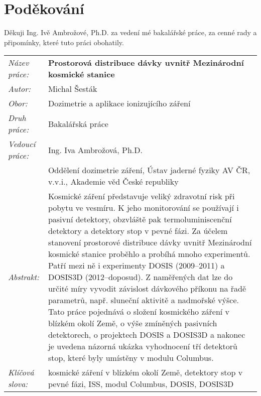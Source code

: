 \section*{Poděkování}
Děkuji Ing. Ivě Ambrožové, Ph.D. za vedení mé bakalářské práce, za cenné rady a připomínky, které tuto práci obohatily.
\newpage
\begin{tabularx}{\textwidth}{>{\itshape}l X}
  Název práce: & \textbf{Prostorová distribuce dávky uvnitř Mezinárodní kosmické stanice}\\
  Autor: & Michal Šesták\\
  Obor: & Dozimetrie a aplikace ionizujícího záření\\
  Druh práce: & Bakalářská práce\\
  Vedoucí práce: & Ing. Iva Ambrožová, Ph.D.\\ 
               & Oddělení dozimetrie záření, Ústav jaderné fyziky AV ČR, v.v.i., Akademie věd České republiky\\
  Abstrakt: & Kosmické záření představuje veliký zdravotní risk při pobytu ve vesmíru. K jeho monitorování se používají i pasivní detektory, obzvláště pak termoluminiscenční detektory a detektory stop v pevné fázi. Za účelem stanovení prostorové distribuce dávky uvnitř Mezinárodní kosmické stanice proběhlo a probíhá mnoho experimentů. Patří mezi ně i experimenty DOSIS (2009--2011) a DOSIS3D (2012--doposud). Z naměřených dat lze do určité míry vyvodit závislost dávkového příkonu na řadě parametrů, např. sluneční aktivitě a nadmořské výšce. 
  Tato práce pojednává o složení kosmického záření v blízkém okolí Země, o výše zmíněných pasivních detektorech, o projektech DOSIS a DOSIS3D a nakonec je uvedena názorná ukázka vyhodnocení tří detektorů stop, které byly umístěny v modulu Columbus. \\
  Klíčová slova: & kosmické záření v blízkém okolí Země, detektory stop v pevné fázi, ISS, modul Columbus, DOSIS, DOSIS3D
\end{tabularx}
\newpage
